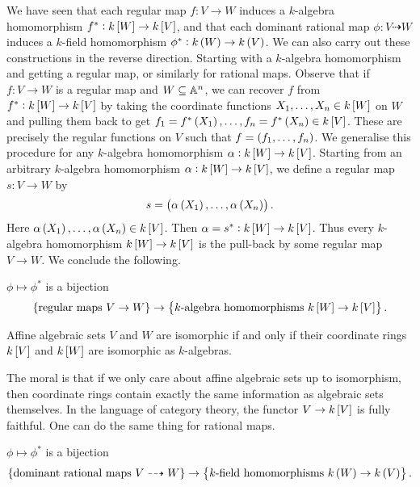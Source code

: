 We have seen that each regular map $ f : V \to W $ induces a $ k $-algebra homomorphism $ f^* : k\sbr{W} \to k\sbr{V} $, and that each dominant rational map $ \phi : V \dashrightarrow W $ induces a $ k $-field homomorphism $ \phi^* : k\br{W} \to k\br{V} $. We can also carry out these constructions in the reverse direction. Starting with a $ k $-algebra homomorphism and getting a regular map, or similarly for rational maps. Observe that if $ f : V \to W $ is a regular map and $ W \subseteq \AA^n $, we can recover $ f $ from $ f^* : k\sbr{W} \to k\sbr{V} $ by taking the coordinate functions $ X_1, \dots, X_n \in k\sbr{W} $ on $ W $ and pulling them back to get $ f_1 = f^*\br{X_1}, \dots, f_n = f^*\br{X_n} \in k\sbr{V} $. These are precisely the regular functions on $ V $ such that $ f = \br{f_1, \dots, f_n} $. We generalise this procedure for any $ k $-algebra homomorphism $ \alpha : k\sbr{W} \to k\sbr{V} $. Starting from an arbitrary $ k $-algebra homomorphism $ \alpha : k\sbr{W} \to k\sbr{V} $, we define a regular map $ s : V \to W $ by
$$ s = \br{\alpha\br{X_1}, \dots, \alpha\br{X_n}}. $$
Here $ \alpha\br{X_1}, \dots, \alpha\br{X_n} \in k\sbr{V} $. Then $ \alpha = s^* : k\sbr{W} \to k\sbr{V} $. Thus every $ k $-algebra homomorphism $ k\sbr{W} \to k\sbr{V} $ is the pull-back by some regular map $ V \to W $. We conclude the following.

\begin{proposition}
$ \phi \mapsto \phi^* $ is a bijection
$$ \cbr{\text{regular maps} \ V \to W} \to \cbr{\text{$ k $-algebra homomorphisms} \ k\sbr{W} \to k\sbr{V}}. $$
\end{proposition}

\begin{corollary}
Affine algebraic sets $ V $ and $ W $ are isomorphic if and only if their coordinate rings $ k\sbr{V} $ and $ k\sbr{W} $ are isomorphic as $ k $-algebras.
\end{corollary}

The moral is that if we only care about affine algebraic sets up to isomorphism, then coordinate rings contain exactly the same information as algebraic sets themselves. In the language of category theory, the functor $ V \to k\sbr{V} $ is fully faithful. One can do the same thing for rational maps.

\begin{proposition}
$ \phi \mapsto \phi^* $ is a bijection
$$ \cbr{\text{dominant rational maps} \ V \dashrightarrow W} \to \cbr{\text{$ k $-field homomorphisms} \ k\br{W} \to k\br{V}}. $$
\end{proposition}


